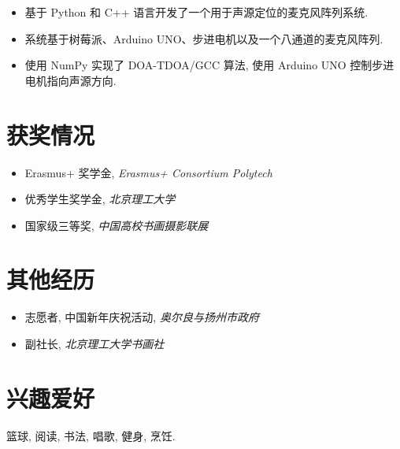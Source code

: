 \documentclass{mycv}
\begin{document}
\begin{itemize}
  \itemsep 0em
  \item 基于 Python 和 C++ 语言开发了一个用于声源定位的麦克风阵列系统.
  \item 系统基于树莓派、Arduino UNO、步进电机以及一个八通道的麦克风阵列.
  \item 使用 NumPy 实现了 DOA-TDOA/GCC 算法, 使用 Arduino UNO 控制步进电机指向声源方向.
\end{itemize}



\vspace{-0.5em}

\section{获奖情况}

\begin{itemize}
  \itemsep 0em
  \item Erasmus+ 奖学金, \textit{Erasmus+ Consortium Polytech} 
  \item 优秀学生奖学金, \textit{北京理工大学} 
  \item 国家级三等奖, \textit{中国高校书画摄影联展} 
\end{itemize}

\vspace{-0.5em}

\section{其他经历}
\begin{itemize}
  \itemsep 0em
  \item 志愿者, 中国新年庆祝活动, \emph{奥尔良与扬州市政府} 
  \item 副社长, \emph{北京理工大学书画社} 
\end{itemize}

\vspace{-0.5em}

\section{兴趣爱好}
篮球, 阅读, 书法, 唱歌, 健身, 烹饪.

\end{document}
